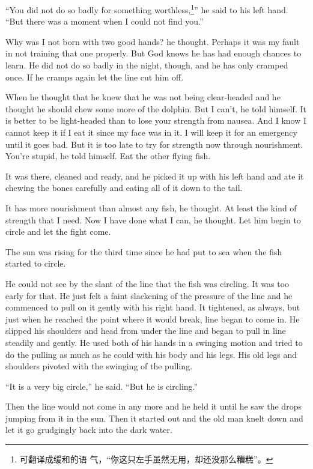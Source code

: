 ``You did not do so badly for something worthless,\footnote{可翻译成缓和的语
  气，“你这只左手虽然无用，却还没那么糟糕”。}'' he said to his left hand.
``But there was a moment when I could not find you.''

Why was I not born with two good hands? he thought. Perhaps it was my fault
in not training that one properly. But God knows he has had enough chances
to learn. He did not do so badly in the night, though, and he has only
cramped once. If he cramps again let the line cut him off.

When he thought that he knew that he was not being \gls{clear-headed} and he
thought he should chew some more of the dolphin. But I can't, he told
himself. It is better to be \gls{light-headed} than to lose your strength from
\gls{nausea}. And I know I cannot keep it if I eat it since my face was in it. I
will keep it for an \gls{emergency} until it goes bad. But it is too late to try
for strength now through \gls{nourishment}. You're stupid, he told himself. Eat
the other flying fish.

It was there, cleaned and ready, and he picked it up with his left hand and
ate it chewing the bones carefully and eating all of it down to the tail.

It has more nourishment than almost any fish, he thought. At least the kind
of strength that I need. Now I have done what I can, he thought. Let him
begin to circle and let the fight come.

The sun was rising for the third time since he had put to sea when the fish
started to circle.

He could not see by the slant of the line that the fish was circling. It was
too early for that. He just felt a faint \gls{slackening} of the pressure of
the line and he commenced to pull on it gently with his right hand. It
tightened, as always, but just when he reached the point where it would
break, line began to come in. He slipped his shoulders and head from under
the line and began to pull in line steadily and gently. He used both of his
hands in a swinging motion and tried to do the pulling as much as he could
with his body and his legs. His old legs and shoulders pivoted with the
swinging of the pulling.

``It is a very big circle,'' he said. ``But he is circling.''

Then the line would not come in any more and he held it until he saw the
drops jumping from it in the sun. Then it started out and the old man \gls{knelt}
down and let it go \gls{grudgingly} back into the dark water.

